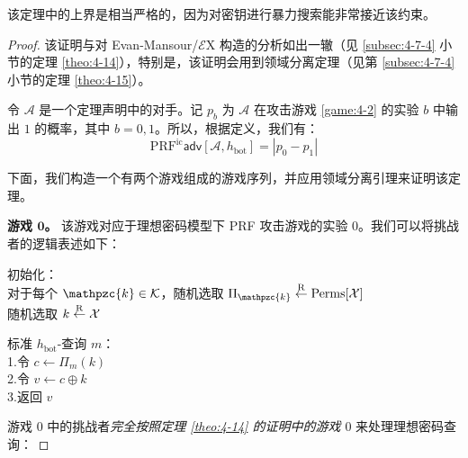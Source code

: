 该定理中的上界是相当严格的，因为对密钥进行暴力搜索能非常接近该约束。

\begin{proof}
该证明与对 Evan-Mansour/$\mathcal{E}$X 构造的分析如出一辙（见 \ref{subsec:4-7-4} 小节的定理 \ref{theo:4-14}），特别是，该证明会用到领域分离定理（见第 \ref{subsec:4-7-4} 小节的定理 \ref{theo:4-15}）。

令 $\mathcal{A}$ 是一个定理声明中的对手。记 $p_b$ 为 $\mathcal{A}$ 在攻击游戏 \ref{game:4-2} 的实验 $b$ 中输出 $1$ 的概率，其中 $b=0,1$。所以，根据定义，我们有：
\begin{equation}\label{eq:8-7}
\mathrm{PRF}^\mathrm{ic}\mathsf{adv}[\mathcal{A},h_\mathrm{bot}]=|p_0-p_1|
\end{equation}

下面，我们构造一个有两个游戏组成的游戏序列，并应用领域分离引理来证明该定理。

\vspace{5pt}

\noindent\textbf{游戏 $\mathbf{0}$。}
该游戏对应于理想密码模型下 PRF 攻击游戏的实验 $0$。我们可以将挑战者的逻辑表述如下：

\vspace{5pt}

\hspace*{5pt} 初始化：\\
\hspace*{50pt} 对于每个 $\mathpzc{k}\in\mathcal{K}$，随机选取 $\Pi_\mathpzc{k}\overset{\rm R}\leftarrow\mathrm{Perms}[\mathcal{X}]$\\
\hspace*{50pt} 随机选取 $k\overset{\rm R}\leftarrow\mathcal{X}$

\vspace{5pt}

\hspace*{5pt} 标准 $h_\mathrm{bot}$-查询 $m$：\\
\hspace*{26pt} 1.\qquad 令 $c\leftarrow\Pi_m(k)$\\
\hspace*{26pt} 2.\qquad 令 $v\leftarrow c\oplus k$\\
\hspace*{26pt} 3.\qquad 返回 $v$

\vspace{5pt}

游戏 $0$ 中的挑战者\emph{完全按照定理 \ref{theo:4-14} 的证明中的游戏 $0$} 来处理理想密码查询：

\vspace{5pt}


\end{proof}
